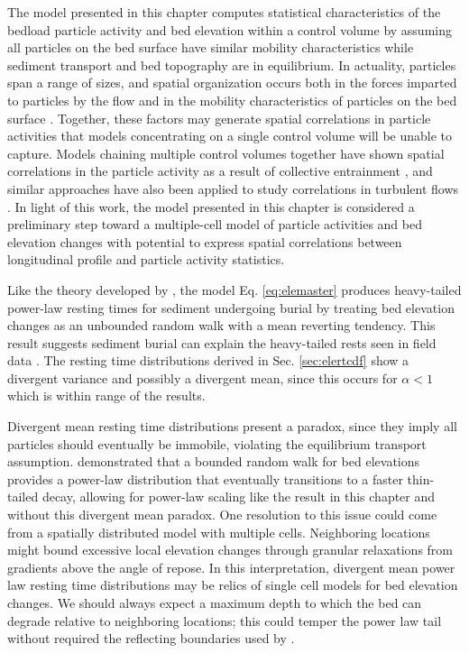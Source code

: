 The model presented in this chapter computes statistical characteristics of the bedload particle activity and bed elevation within a control volume by assuming all particles on the bed surface have similar mobility characteristics while sediment transport and bed topography are in equilibrium. In actuality, particles span a range of sizes, and spatial organization occurs both in the forces imparted to particles by the flow \citep{Shih2017,Amir2014} and in the mobility characteristics of particles on the bed surface \citep{Charru2004, Hassan2008, Nelson2014}.
Together, these factors may generate spatial correlations in particle activities that models concentrating on a single control volume will be unable to capture. 
Models chaining multiple control volumes together have shown spatial correlations in the particle activity as a result of collective entrainment \citep{Heyman2014, Ancey2015}, and similar approaches have also been applied to study correlations in turbulent flows \citep{Gardiner1983}. In light of this work, the model presented in this chapter is considered a preliminary step toward a multiple-cell model of particle activities and bed elevation changes with potential to express spatial correlations between longitudinal profile and particle activity statistics.

Like the theory developed by \citet{Martin2014}, the model Eq. \ref{eq:elemaster} produces heavy-tailed power-law resting times for sediment undergoing burial by treating bed elevation changes as an unbounded random walk with a mean reverting tendency.
This result suggests sediment burial can explain the heavy-tailed rests seen in field data \citep{Olinde2015,Bradley2017,Pretzlav2016a}. 
The resting time distributions derived in Sec. \ref{sec:elertcdf} show a divergent variance and possibly a divergent mean, since this occurs for $\alpha < 1$ \citep{Sornette2006} which is within range of the results.

Divergent mean resting time distributions present a paradox, since they imply all particles should eventually be immobile, violating the equilibrium transport assumption.
\citet{Voepel2013} demonstrated that a bounded random walk for bed elevations provides a power-law distribution that eventually transitions to a faster thin-tailed decay, allowing for power-law scaling like the result in this chapter and \citet{Martin2014} without this divergent mean paradox. 
One resolution to this issue could come from a spatially distributed model with multiple cells.
Neighboring locations might bound excessive local elevation changes through granular relaxations from gradients above the angle of repose.
In this interpretation, divergent mean power law resting time distributions may be relics of single cell models for bed elevation changes.
We should always expect a maximum depth to which the bed can degrade relative to neighboring locations; this could temper the power law tail without required the reflecting boundaries used by \citet{Voepel2013}.


